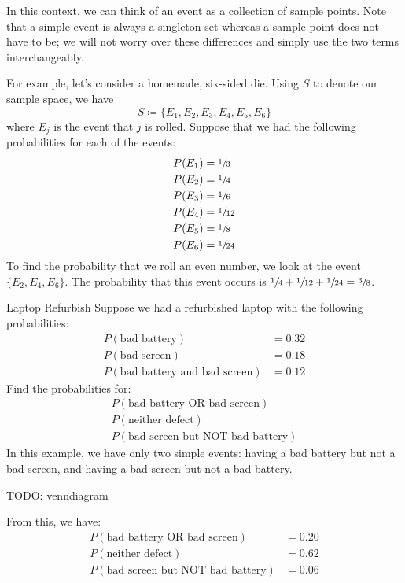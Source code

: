 In this context, we can think of an event as a collection of sample points. Note that a simple event is always a singleton set whereas a sample point does not have to be; we will not worry over these differences and simply use the two terms interchangeably.

For example, let's consider a homemade, six-sided die. Using $S$ to denote our sample space, we have
\[ S \coloneq \{ E_1, E_2, E_3, E_4, E_5, E_6 \} \]
where $E_j$ is the event that $j$ is rolled. Suppose that we had the following probabilities for each of the events:
\begin{align*}
    P(E_1) &= \sfrac13 \\
    P(E_2) &= \sfrac14 \\
    P(E_3) &= \sfrac16 \\
    P(E_4) &= \sfrac{1}{12} \\
    P(E_5) &= \sfrac18 \\
    P(E_6) &= \sfrac{1}{24}
\end{align*}
To find the probability that we roll an even number, we look at the event $\{E_2, E_4, E_6\}$. The probability that this event occurs is $\sfrac{1}{4} + \sfrac{1}{12} + \sfrac{1}{24} = \sfrac{3}{8}$. 

\begin{exbox}{Laptop Refurbish}{}
    Suppose we had a refurbished laptop with the following probabilities:
    \begin{align*}
        P(\text{bad battery}) &= 0.32 \\
        P(\text{bad screen}) &= 0.18 \\
        P(\text{bad battery and bad screen}) &= 0.12
    \end{align*}
    Find the probabilities for:
    \begin{align*}
        P(\text{bad battery OR bad screen}) \\
        P(\text{neither defect}) \\
        P(\text{bad screen but NOT bad battery})
    \end{align*}
    \tcblower
    In this example, we have only two simple events: having a bad battery but not a bad screen, and having a bad screen but not a bad battery.

    TODO: venndiagram

    From this, we have:
    \begin{align*}
        P(\text{bad battery OR bad screen}) &= 0.20 \\
        P(\text{neither defect}) &= 0.62 \\
        P(\text{bad screen but NOT bad battery}) &= 0.06
    \end{align*}
\end{exbox}

